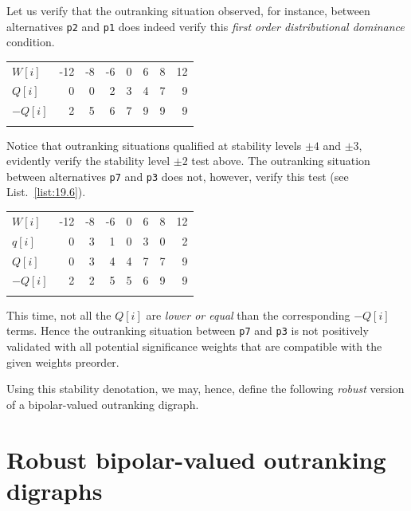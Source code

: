 Let us verify that the outranking situation observed, for instance, between alternatives \texttt{p2} and \texttt{p1} does indeed verify this \emph{first order distributional dominance} condition. \hfill
\begin{center}
\begin{tabular}{l|r|r|r|r|r|r|r}
 \svhline\noalign{\smallskip}
  $W[i]$ & -12 & -8  & -6  &  0  &  6  &  8 &  12\\  
 \noalign{\smallskip}\hline\noalign{\smallskip}
  $Q[i]$  &  0 &  0 &   2 &   3  &  4  &  7  &  9 \\
  $-Q[i]$  &  2 &  5 &   6 &   7  &  9  &  9  &  9 \\
 \noalign{\smallskip}\hline
\end{tabular}
\end{center}

Notice that outranking situations qualified at stability levels $\pm 4$ and $\pm 3$, evidently verify the stability level $\pm 2$ test above. The outranking situation between alternatives \texttt{p7} and \texttt{p3} does not, however, verify this test (see List.~\vref{list:19.6}).\hfill
\begin{center}
\begin{tabular}{l|r|r|r|r|r|r|r}
 \svhline\noalign{\smallskip}
  $W[i]$ & -12 & -8  & -6  &  0  &  6  &  8 &  12\\  
 \noalign{\smallskip}\hline\noalign{\smallskip}
  $q[i]$  &  0 &  3 &   1 &   0  &  3  &  0  &  2 \\
  $Q[i]$  &  0 &  3 &   4 &   4  &  7  &  7  &  9 \\
  $-Q[i]$  &  2 &  2 &   5 &   5  &  6  &  9  &  9 \\
 \noalign{\smallskip}\hline
\end{tabular}
\end{center}

This time, not all the $Q[i]$ are \emph{lower or equal} than the corresponding $-Q[i]$ terms. Hence the outranking situation between \texttt{p7} and \texttt{p3} is not positively validated with all potential significance weights that are compatible with the given weights preorder.

Using this stability denotation, we may, hence, define the following \emph{robust} version of a bipolar-valued outranking digraph.

\section{Robust bipolar-valued outranking digraphs}
\label{sec:19.4}

